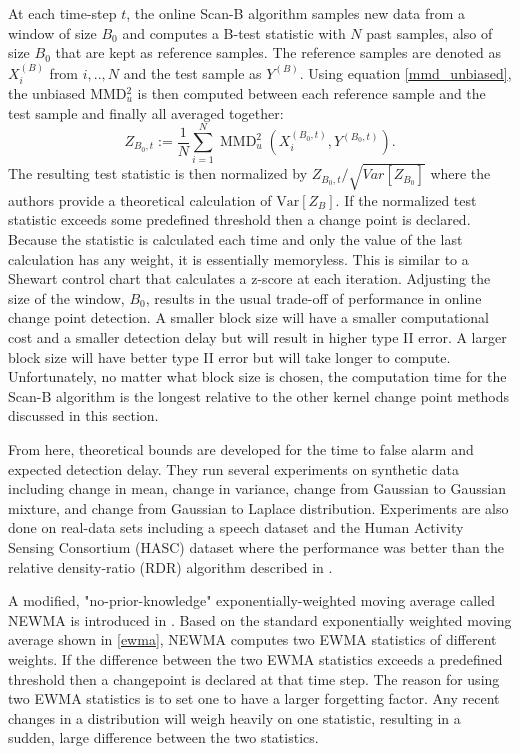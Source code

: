At each time-step $t$, the online Scan-B algorithm samples new data from a window of size $B_0$ and computes a B-test statistic with $N$ past samples, also of size $B_0$ that are kept as reference samples. The reference samples are denoted as $X_{i}^{(B)}$ from $i,..,N$ and the test sample as $Y^{(B)}$. Using equation \ref{mmd_unbiased}, the unbiased MMD$_u^2$ is then computed between each reference sample and the test sample and finally all averaged together:
\begin{equation}
Z_{B_{0}, t}:=\frac{1}{N} \sum_{i=1}^{N} \operatorname{MMD}_{u}^{2}\left(X_{i}^{\left(B_{0}, t\right)}, Y^{\left(B_{0}, t\right)}\right).
\end{equation}
The resulting test statistic is then normalized by $Z_{B_{0}, t}/\sqrt{Var[Z_{B_0}]}$ where the authors provide a theoretical calculation of $\text{Var}[Z_B]$. If the normalized test statistic exceeds some predefined threshold then a change point is declared. Because the statistic is calculated each time and only the value of the last calculation has any weight,  it is essentially  memoryless. This is similar to a Shewart control chart that calculates a z-score at each iteration. Adjusting the size of the window, $B_0$, results in the usual trade-off of performance in online change point detection. A smaller block size will have a smaller computational cost and a smaller detection delay but will result in higher type II error. A larger block size will have better type II error but will take longer to compute. Unfortunately, no matter what block size is chosen, the computation time for the Scan-B algorithm is the longest relative to the other kernel change point methods discussed in this section. 

From here, theoretical bounds are developed for the time to false alarm and expected detection delay. They run several experiments on synthetic data including change in mean, change in variance, change from Gaussian to Gaussian mixture, and change from Gaussian to Laplace distribution. Experiments are also done on real-data sets including a speech dataset and the Human Activity Sensing Consortium (HASC) dataset where the performance was better than the relative density-ratio (RDR) algorithm described in \cite{liu2013change}.


A modified, "no-prior-knowledge" exponentially-weighted moving average called NEWMA is introduced in \cite{keriven2020newma}. Based on the standard exponentially weighted moving average shown in \ref{ewma}, NEWMA computes two EWMA statistics of different weights. If the difference between the two EWMA statistics exceeds a predefined threshold then a changepoint is declared at that time step. The reason for using two EWMA statistics is to set one to have a larger forgetting factor. Any recent changes in a distribution will weigh heavily on one statistic, resulting in a sudden, large difference between the two statistics. 

